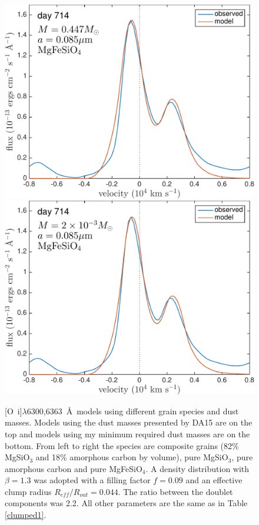 \begin{figure}
\includegraphics[trim =0 0 0 0,clip=true,scale=0.33]{chapters/chapter5/images/silicates_take2/OI/MgFeSiO4_Dwek.pdf}
\hspace{3mm}
\includegraphics[trim =0 0 0 -25,clip=true,scale=0.33]{chapters/chapter5/images/silicates_take2/OI/MgFeSiO4_bestfit.pdf}

\caption{[O~{\sc i}]$\lambda$6300,6363~\AA\ models using different grain 
species and dust masses.  Models using the dust masses presented by DA15 
are on the top and models using my minimum required dust masses are on 
the bottom.  From left to right the species are composite grains (82\% 
MgSiO$_3$ and 18\% amorphous carbon by volume), pure MgSiO$_3$, pure 
amorphous carbon and pure MgFeSiO$_4$.  A density distribution with 
$\beta=1.3$ was adopted with a filling factor $f=0.09$ and an effective 
clump radius $R_{eff}/R_{out}=0.044$. The ratio between the 
doublet components was 2.2. All other parameters are the same as in 
Table \ref{clumped1}.}
\label{Dwek_models_OI}
\end{figure}

